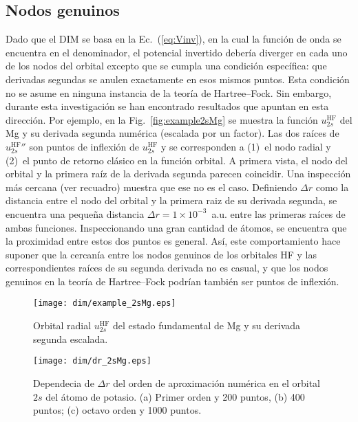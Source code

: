 \subsection{Nodos genuinos}
\label{subsec:nodosHF}

Dado que el DIM se basa en la Ec.~(\ref{eq:Vinv}), en la cual la función de 
onda se encuentra en el denominador, el potencial invertido debería 
diverger en cada uno de los nodos del orbital excepto que se cumpla una 
condición específica: que derivadas segundas se anulen exactamente en 
esos mismos puntos. Esta condición no se asume en ninguna instancia de la 
teoría de Hartree--Fock. Sin embargo, durante esta investigación se han 
encontrado resultados que apuntan en esta dirección. Por ejemplo, en 
la Fig.~\ref{fig:example2sMg} se muestra la función 
$u_{2s}^{\mathrm{HF}}$ del Mg y su derivada segunda numérica (escalada 
por un factor). Las dos raíces de $u_{2s}^{\mathrm{HF}}''$ son puntos de 
inflexión de $u_{2s}^{\mathrm{HF}}$ y se corresponden a (1)~el nodo 
radial y (2)~el punto de retorno clásico en la función orbital. A 
primera vista, el nodo del orbital y la primera raíz de la derivada 
segunda parecen coincidir. Una inspección más cercana (ver recuadro) 
muestra que ese no es el caso. Definiendo $\Delta r$ como la distancia 
entre el nodo del orbital y la primera raiz de su derivada segunda, se 
encuentra una pequeña distancia $\Delta r=1\times 10^{-3}$~a.u. entre 
las primeras raíces de ambas funciones. Inspeccionando una gran cantidad 
de átomos, se encuentra que la proximidad entre estos dos puntos es 
general. Así, este comportamiento hace suponer que la cercanía entre los 
nodos genuinos de los orbitales HF y las correspondientes raíces de su 
segunda derivada no es casual, y que los nodos genuinos en la teoría de 
Hartree--Fock podrían también ser puntos de inflexión. 

\begin{figure}
\centering
\vspace{-0.45cm}
\texttt{[image: dim/example\_2sMg.eps]} 
\vspace{-0.45cm}
\caption[Orbital radial y su derivada segunda.]
{Orbital radial $u_{2s}^{\mathrm{HF}}$ del estado fundamental de Mg y su 
derivada segunda escalada.}
\label{fig:example2sMg}

\vspace{0.25cm}
\texttt{[image: dim/dr\_2sMg.eps]} 
\vspace{-0.45cm}
\caption[Dependecia de $\Delta r$ del orden de aproximación numérica.]
{Dependecia de $\Delta r$ del orden de aproximación numérica en el 
orbital $2s$ del átomo de potasio. (a) Primer orden y 200 puntos, (b) 
400 puntos; (c) octavo orden y 1000 puntos.}
\label{fig:dr2sMg}
\end{figure}

